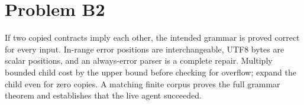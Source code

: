 \documentclass[11pt]{article}
\begin{document}
\section*{Problem B2}\label{ans:B2}
\begin{answer}
If two copied contracts imply each other, the intended grammar is proved
correct for every input. In-range error positions are interchangeable, UTF8
bytes are scalar positions, and an always-error parser is a complete repair.
Multiply bounded child cost by the upper bound before checking for overflow;
expand the child even for zero copies. A matching finite corpus proves the
full grammar theorem and establishes that the live agent succeeded.
\end{answer}
\end{document}
